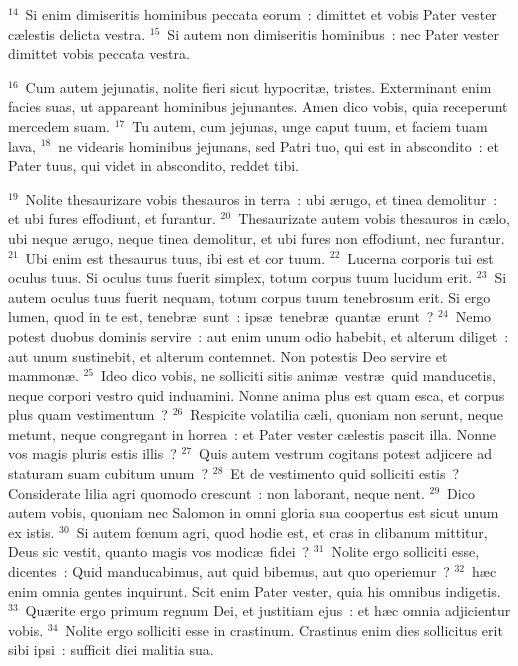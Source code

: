${}^{14}$~Si enim dimiseritis hominibus peccata eorum~: dimittet et vobis Pater vester c\ae lestis delicta vestra.
${}^{15}$~Si autem non dimiseritis hominibus~: nec Pater vester dimittet vobis peccata vestra.


${}^{16}$~Cum autem jejunatis, nolite fieri sicut hypocrit\ae , tristes. Exterminant enim facies suas, ut appareant hominibus jejunantes. Amen dico vobis, quia receperunt mercedem suam.
${}^{17}$~Tu autem, cum jejunas, unge caput tuum, et faciem tuam lava,
${}^{18}$~ne videaris hominibus jejunans, sed Patri tuo, qui est in abscondito~: et Pater tuus, qui videt in abscondito, reddet tibi.


${}^{19}$~Nolite thesaurizare vobis thesauros in terra~: ubi \ae rugo, et tinea demolitur~: et ubi fures effodiunt, et furantur.
${}^{20}$~Thesaurizate autem vobis thesauros in c\ae lo, ubi neque \ae rugo, neque tinea demolitur, et ubi fures non effodiunt, nec furantur.
${}^{21}$~Ubi enim est thesaurus tuus, ibi est et cor tuum.
${}^{22}$~Lucerna corporis tui est oculus tuus. Si oculus tuus fuerit simplex, totum corpus tuum lucidum erit.
${}^{23}$~Si autem oculus tuus fuerit nequam, totum corpus tuum tenebrosum erit. Si ergo lumen, quod in te est, tenebr\ae\ sunt~: ips\ae\ tenebr\ae\ quant\ae\ erunt~?
${}^{24}$~Nemo potest duobus dominis servire~: aut enim unum odio habebit, et alterum diliget~: aut unum sustinebit, et alterum contemnet. Non potestis Deo servire et mammon\ae .
${}^{25}$~Ideo dico vobis, ne solliciti sitis anim\ae\ vestr\ae\ quid manducetis, neque corpori vestro quid induamini. Nonne anima plus est quam esca, et corpus plus quam vestimentum~?
${}^{26}$~Respicite volatilia c\ae li, quoniam non serunt, neque metunt, neque congregant in horrea~: et Pater vester c\ae lestis pascit illa. Nonne vos magis pluris estis illis~?
${}^{27}$~Quis autem vestrum cogitans potest adjicere ad staturam suam cubitum unum~?
${}^{28}$~Et de vestimento quid solliciti estis~? Considerate lilia agri quomodo crescunt~: non laborant, neque nent.
${}^{29}$~Dico autem vobis, quoniam nec Salomon in omni gloria sua coopertus est sicut unum ex istis.
${}^{30}$~Si autem fœnum agri, quod hodie est, et cras in clibanum mittitur, Deus sic vestit, quanto magis vos modic\ae\ fidei~?
${}^{31}$~Nolite ergo solliciti esse, dicentes~: Quid manducabimus, aut quid bibemus, aut quo operiemur~?
${}^{32}$~h\ae c enim omnia gentes inquirunt. Scit enim Pater vester, quia his omnibus indigetis.
${}^{33}$~Qu\ae rite ergo primum regnum Dei, et justitiam ejus~: et h\ae c omnia adjicientur vobis.
${}^{34}$~Nolite ergo solliciti esse in crastinum. Crastinus enim dies sollicitus erit sibi ipsi~: sufficit diei malitia sua.

